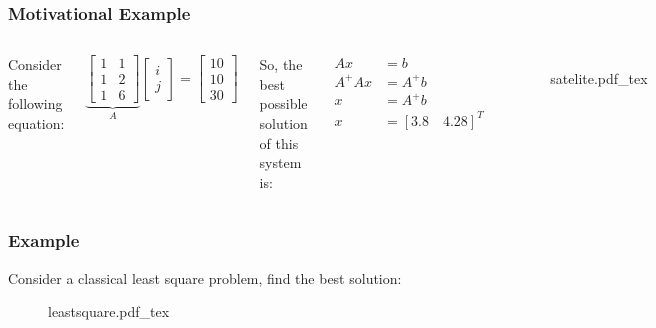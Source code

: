 \documentclass[aspectratio=169]{beamer}
\newcommand{\incfig}[2][1]{%
    \def\svgwidth{#1\columnwidth}
    {#2.pdf_tex} }
\begin{document}
\begin{frame} %
	\frametitle{Motivational Example}  %
	\begin{columns}


	Consider the following equation:

	\begin{equation*}
		\underbrace{\begin{bmatrix} 1 & 1 \\ 1 & 2 \\ 1 & 6 \end{bmatrix}}_A \begin{bmatrix} i \\ j  \end{bmatrix} = \begin{bmatrix} 10 \\ 10 \\ 30 \end{bmatrix}
	\end{equation*}

So, the best possible solution of this system is:

\begin{align*}
	A x &= b \\
	A^+ A x &= A^+ b \\
	x &= A^+ b\\
	x & = [3.8 \quad 4.28]^T
\end{align*}
	\begin{figure}[ht]
    		\centering
	    \incfig{satelite}
	\end{figure}
	\end{columns}

\end{frame}

\begin{frame}
	\frametitle{Example}

	Consider a classical least square problem, find the best solution:

\begin{figure}[ht]
    \centering
    \incfig{leastsquare}
    \label{fig:leastsquare}
\end{figure}


\end{frame}
\end{document}
